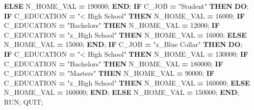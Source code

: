 \documentclass[]{article}
\newenvironment{Shaded}{\begin{snugshade}}{\end{snugshade}}
\newcommand{\KeywordTok}[1]{\textcolor[rgb]{0.13,0.29,0.53}{\textbf{{#1}}}}
\newcommand{\DecValTok}[1]{\textcolor[rgb]{0.00,0.00,0.81}{{#1}}}
\newcommand{\StringTok}[1]{\textcolor[rgb]{0.31,0.60,0.02}{{#1}}}
\newcommand{\NormalTok}[1]{{#1}}
\begin{document}
\begin{Shaded}
\begin{Highlighting}[]
            \KeywordTok{ELSE} \NormalTok{N_HOME_VAL }\KeywordTok{=} \DecValTok{190000}\NormalTok{;}
        \KeywordTok{END}\NormalTok{;}
        \KeywordTok{IF} \NormalTok{C_JOB }\KeywordTok{=} \StringTok{"Student"} \KeywordTok{THEN} \KeywordTok{DO}\NormalTok{;}
            \KeywordTok{IF} \NormalTok{C_EDUCATION }\KeywordTok{=} \StringTok{"< High School"} \KeywordTok{THEN} \NormalTok{N_HOME_VAL }\KeywordTok{=} \DecValTok{16000}\NormalTok{;}
            \KeywordTok{IF} \NormalTok{C_EDUCATION }\KeywordTok{=} \StringTok{"Bachelors"} \KeywordTok{THEN} \NormalTok{N_HOME_VAL }\KeywordTok{=} \DecValTok{12000}\NormalTok{;}
            \KeywordTok{IF} \NormalTok{C_EDUCATION }\KeywordTok{=} \StringTok{"z_High School"} \KeywordTok{THEN} \NormalTok{N_HOME_VAL }\KeywordTok{=} \DecValTok{16000}\NormalTok{;}
            \KeywordTok{ELSE} \NormalTok{N_HOME_VAL }\KeywordTok{=} \DecValTok{15000}\NormalTok{;}
        \KeywordTok{END}\NormalTok{;}
        \KeywordTok{IF} \NormalTok{C_JOB }\KeywordTok{=} \StringTok{"z_Blue Collar"} \KeywordTok{THEN} \KeywordTok{DO}\NormalTok{;}
            \KeywordTok{IF} \NormalTok{C_EDUCATION }\KeywordTok{=} \StringTok{"< High School"} \KeywordTok{THEN} \NormalTok{N_HOME_VAL }\KeywordTok{=} \DecValTok{130000}\NormalTok{;}
            \KeywordTok{IF} \NormalTok{C_EDUCATION }\KeywordTok{=} \StringTok{"Bachelors"} \KeywordTok{THEN} \NormalTok{N_HOME_VAL }\KeywordTok{=} \DecValTok{180000}\NormalTok{;}
            \KeywordTok{IF} \NormalTok{C_EDUCATION }\KeywordTok{=} \StringTok{"Masters"} \KeywordTok{THEN} \NormalTok{N_HOME_VAL }\KeywordTok{=} \DecValTok{90000}\NormalTok{;}
            \KeywordTok{IF} \NormalTok{C_EDUCATION }\KeywordTok{=} \StringTok{"z_High School"} \KeywordTok{THEN} \NormalTok{N_HOME_VAL }\KeywordTok{=} \DecValTok{160000}\NormalTok{;}
            \KeywordTok{ELSE} \NormalTok{N_HOME_VAL }\KeywordTok{=} \DecValTok{160000}\NormalTok{;}
        \KeywordTok{END}\NormalTok{;}
        \KeywordTok{ELSE} \NormalTok{N_HOME_VAL }\KeywordTok{=} \DecValTok{150000}\NormalTok{;}
    \KeywordTok{END}\NormalTok{;}
\NormalTok{RUN; QUIT;}
\end{Highlighting}
\end{Shaded}

\hypertarget{refs}{}
\end{document}
